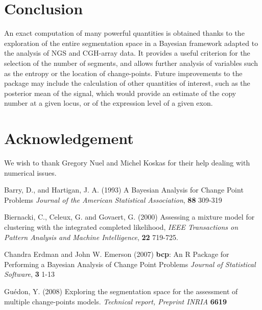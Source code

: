 \documentclass{bioinfo}
\begin{document}
\begin{methods}
\section{Conclusion}

An exact computation of many powerful quantities is obtained thanks to
the exploration of the entire segmentation space in a Bayesian
framework adapted to the analysis of NGS and CGH-array data.  It
provides a useful criterion for the selection of the number of
segments, and allows further analysis of variables such as the entropy
or the location of change-points.  Future improvements to the package
may include the calculation of other quantities of
interest, such as the posterior mean of the signal, which would
  provide an estimate of the copy number at a given locus, or of the
  expression level of a given exon.



\section*{Acknowledgement}
We wish to thank Gregory Nuel and Michel Koskas for their help dealing with numerical issues.


%
%
%
%

%
%
%
%


\begin{thebibliography}{}

 Barry, D., and Hartigan, J. A. (1993) A Bayesian Analysis for Change Point Problems {\it Journal of the American Statistical Association}, {\bf 88} 309-319

 Biernacki, C., Celeux, G. and Govaert, G. (2000) Assessing a mixture model for clustering with the integrated completed likelihood, {\it{IEEE} Transactions on Pattern Analysis and Machine Intelligence}, {\bf 22} 719-725.

   Chandra Erdman and John W. Emerson (2007) {\bf{bcp}}: An {R} Package for Performing a Bayesian Analysis
      of Change Point Problems {\it Journal of Statistical Software}, {\bf 3} 1-13

 Gu\'{e}don, Y. (2008) Exploring the segmentation space for the assessment of multiple change-points models. {\it Technical report, Preprint INRIA} {\bf 6619}


\end{thebibliography}
\end{methods}
\end{document}
